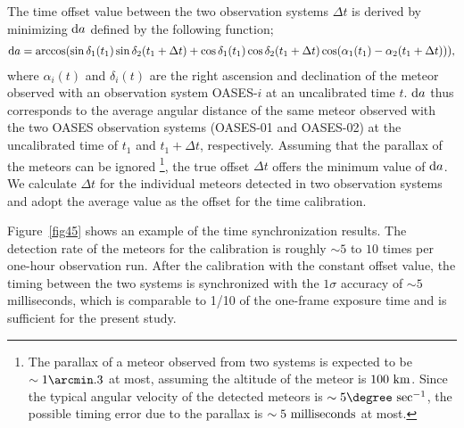 \documentclass{pasj01}
\begin{document}
The time offset value between the two observation systems $\Delta t$  
is derived by minimizing ${\rm d}a$ defined by the following function;
\footnotesize
\begin{eqnarray}\label{eq_da}
{\rm d}a = \arccos(\sin{\delta_{1}(t_{1})} \sin{\delta_{2}(t_{1}+\Delta t)} + \cos{\delta_{1}(t_{1})} \cos{\delta_{2}(t_{1}+\Delta t)\cos(\alpha_{1}(t_{1}) - \alpha_{2}(t_{1}+\Delta t))}),
\end{eqnarray}
\normalsize
where $\alpha_i (t)$ and $\delta_i (t)$ 
are the right ascension and declination of the meteor observed with an observation system OASES-$i$ 
at an uncalibrated time $t$.
${\rm d}a$ thus corresponds to the average angular distance of the same meteor 
observed with the two OASES observation systems (OASES-01 and OASES-02) 
at the uncalibrated time of $t_1$ and $t_1 + \Delta t$, respectively. 
Assuming that the parallax of the meteors can be ignored
\footnote[1]{The parallax of a meteor observed from two systems is expected to be $\sim 1\arcmin.3$ at most, 
assuming the altitude of the meteor is $100\ {\rm km}$.
Since the typical angular velocity of the detected meteors is $\sim 5\degree \ {\rm sec^{-1}}$,
the possible timing error due to the parallax is $\sim 5 \ {\rm milliseconds}$ at most.},
the true offset $\Delta t$ offers the minimum value of ${\rm d}a$.
We calculate $\Delta t$ for the individual meteors detected in two observation systems
and adopt the average value as the offset for the time calibration.

Figure~\ref{fig45} shows an example of the time synchronization results.
The detection rate of the meteors for the calibration 
is roughly $\sim 5$ to $10$ times per one-hour observation run.
After the calibration with the constant offset value, 
the timing between the two systems 
is synchronized with the $1\sigma$ accuracy of $\sim 5$ milliseconds, 
which is comparable to 1/10 of the one-frame exposure time
and is sufficient for the present study.
\end{document}
